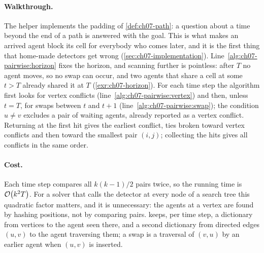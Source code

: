 \begin{algorithm}[!htb]
\caption{First conflict of a plan by pairwise comparison}
\label{alg:ch07-pairwise}
\end{algorithm}

\paragraph{Walkthrough.}
The helper \MapfPosition implements the padding of \cref{def:ch07-path}: a
question about a time beyond the end of a path is answered with the goal.
This is what makes an arrived agent block its cell for everybody who comes
later, and it is the first thing that home-made detectors get wrong
(\cref{sec:ch07-implementation}). Line~\ref{alg:ch07-pairwise:horizon} fixes
the horizon, and scanning further is pointless: after $T$ no agent moves, so
no swap can occur, and two agents that share a cell at some $t > T$ already
shared it at $T$ (\cref{exr:ch07-horizon}). For each time step the algorithm
first looks for vertex conflicts (line~\ref{alg:ch07-pairwise:vertex}) and
then, unless $t = T$, for swaps between $t$ and $t+1$
(line~\ref{alg:ch07-pairwise:swap}); the condition $u \ne v$ excludes a pair
of waiting agents, already reported as a vertex conflict. Returning at the
first hit gives the earliest conflict, ties broken toward vertex conflicts
and then toward the smallest pair $(i, j)$; collecting the hits gives all
conflicts in the same order.

\paragraph{Cost.}
Each time step compares all $k(k-1)/2$ pairs twice, so the running time is
$\mathcal{O}\!\left(k^2 T\right)$. For a solver that calls the detector at every node of a search
tree this quadratic factor matters, and it is unnecessary: the agents at a
vertex are found by hashing positions, not by comparing pairs.
 keeps, per time step, a dictionary from vertices
to the agent seen there, and a second dictionary from directed edges
$(u, v)$ to the agent traversing them; a swap is a traversal of $(v, u)$ by
an earlier agent when $(u, v)$ is inserted.

